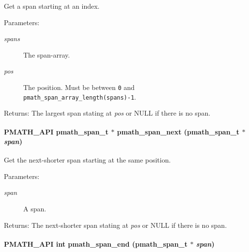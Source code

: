 Get a span starting at an index. 

\begin{Desc}
\item[Parameters:]
\begin{description}
\item[{\em spans}]The span-array. \item[{\em pos}]The position. Must be between {\tt 0} and {\tt pmath\_\-span\_\-array\_\-length(spans)-1}. \end{description}
\end{Desc}
\begin{Desc}
\item[Returns:]The largest span stating at {\em pos\/} or NULL if there is no span. \end{Desc}
\hypertarget{group__parser_g851892aa27e31d261213853112567202}{
\paragraph[{pmath\_\-span\_\-next}]{\setlength{\rightskip}{0pt plus 5cm}PMATH\_\-API {\bf pmath\_\-span\_\-t} $\ast$ pmath\_\-span\_\-next ({\bf pmath\_\-span\_\-t} $\ast$ {\em span})}\hfill}
\label{group__parser_g851892aa27e31d261213853112567202}


Get the next-shorter span starting at the same position. 

\begin{Desc}
\item[Parameters:]
\begin{description}
\item[{\em span}]A span. \end{description}
\end{Desc}
\begin{Desc}
\item[Returns:]The next-shorter span stating at {\em pos\/} or NULL if there is no span. \end{Desc}
\hypertarget{group__parser_g67b9dc2f6484ebbe48481b2b87d76b33}{
\paragraph[{pmath\_\-span\_\-end}]{\setlength{\rightskip}{0pt plus 5cm}PMATH\_\-API int pmath\_\-span\_\-end ({\bf pmath\_\-span\_\-t} $\ast$ {\em span})}\hfill}
\label{group__parser_g67b9dc2f6484ebbe48481b2b87d76b33}


